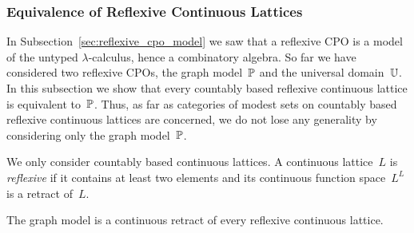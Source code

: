 \subsubsection{Equivalence of Reflexive Continuous Lattices}
\label{sec:equivalence_reflexive_continuous_lattices}%

%
%

In Subsection~\cref{sec:reflexive_cpo_model} we saw that a reflexive
CPO is a model of the untyped $\lambda$-calculus, hence a combinatory
algebra. So far we have considered two reflexive CPOs, the graph
model~$\mathbb{P}$ and the universal domain~$\mathbb{U}$. In this subsection we show
that every countably based reflexive continuous lattice is equivalent
to~$\mathbb{P}$. Thus, as far as categories of modest sets on countably based
reflexive continuous lattices are concerned, we do not lose any
generality by considering only the graph model~$\mathbb{P}$.

We only consider countably based continuous lattices.
%
%
%
%
A continuous lattice~$L$ is \emph{reflexive} if it contains at least
two elements and its continuous function space~$L^L$ is a retract
of~$L$.

\begin{proposition}
  \label{th:PP_retract_of_reflexive_lattice}%
  The graph model is a continuous retract of every reflexive
  continuous lattice.
\end{proposition}

